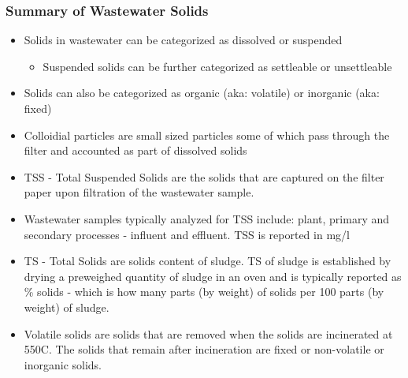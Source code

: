 	\subsubsection{Summary of Wastewater Solids}		
			\begin{itemize}
				\item Solids in wastewater can be categorized as dissolved or suspended
				      \begin{itemize}
				      	\item Suspended solids can be further categorized as settleable or unsettleable
				      \end{itemize}
				\item Solids can also be categorized as organic (aka: volatile) or inorganic (aka: fixed)
				\item Colloidial particles are small sized particles some of which pass through the filter and accounted as part of dissolved solids
				\item TSS - Total Suspended Solids are the solids that are captured on the filter paper upon filtration of the wastewater sample.  
				\item Wastewater samples typically analyzed for TSS include:  plant, primary and secondary processes - influent and effluent.  TSS is reported in mg/l
				\item TS - Total Solids are solids content of sludge.  TS of sludge is established by drying a preweighed quantity of sludge in an oven and is typically reported as \% solids - which is how many parts (by weight) of solids per 100 parts (by weight) of sludge.
				\item Volatile solids are solids that are removed when the solids are incinerated at 550C.  The solids that remain after incineration are fixed or non-volatile or inorganic solids.
			\end{itemize}

